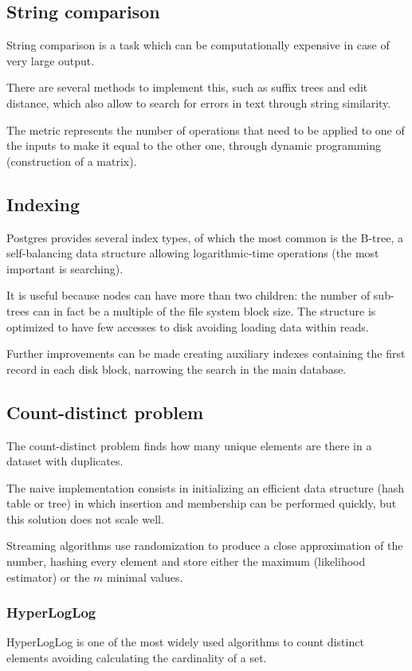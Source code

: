 \subsection{String comparison}
String comparison is a task which can be computationally expensive in case of very large output. 

There are several methods to implement this, such as suffix trees and edit distance, which also allow to search for errors in text through string similarity. 

The metric represents the number of operations that need to be applied to one of the inputs to make it equal to the other one, through dynamic programming (construction of a matrix). 

\subsection{Indexing}
Postgres provides several index types, of which the most common is the B-tree, a self-balancing data structure allowing logarithmic-time operations (the most important is searching).

It is useful because nodes can have more than two children: the number of sub-trees can in fact be a multiple of the file system block size. The structure is optimized to have few accesses to disk avoiding loading data within reads.

Further improvements can be made creating auxiliary indexes containing the first record in each disk block, narrowing the search in the main database.

\subsection{Count-distinct problem}
The count-distinct problem finds how many unique elements are there in a dataset with duplicates. 

The naive implementation consists in initializing an efficient data structure (hash table or tree) in which insertion and membership can be performed quickly, but this solution does not scale well.

Streaming algorithms use randomization to produce a close approximation of the number, hashing every element and store either the maximum (likelihood estimator) or the $m$ minimal values.

\subsubsection{HyperLogLog}
HyperLogLog is one of the most widely used algorithms to count distinct elements avoiding calculating the cardinality of a set.

